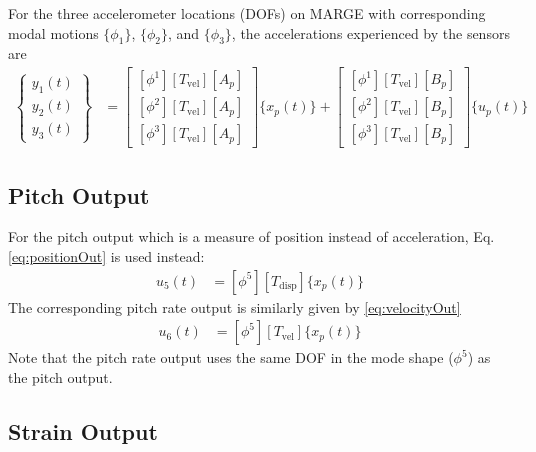 For the three accelerometer locations (DOFs) on MARGE with corresponding modal motions $\{\phi_1\}$, $\{\phi_2\}$, and $\{\phi_3\}$, the accelerations experienced by the sensors are
\begin{align}
	\begin{Bmatrix} 	y_1(t) \\ y_2(t) \\ y_3(t) \end{Bmatrix}
	&= \begin{bmatrix}
		\left[ \phi^1 \right] [T_\text{vel}] [A_p] \\
		\left[ \phi^2 \right] [T_\text{vel}] [A_p] \\
		\left[ \phi^3 \right] [T_\text{vel}] [A_p]
	\end{bmatrix} \{x_p(t)\}
	+ \begin{bmatrix}
		\left[ \phi^1 \right] [T_\text{vel}] [B_p] \\
		\left[ \phi^2 \right] [T_\text{vel}] [B_p] \\
		\left[ \phi^3 \right] [T_\text{vel}] [B_p]
	\end{bmatrix} \{u_p(t)\}
\end{align}

\subsection{Pitch Output} %

For the pitch output which is a measure of position instead of acceleration, Eq. \ref{eq:positionOut} is used instead:
\begin{align}
	u_5(t) &= \left[ \phi^5 \right] [T_\text{disp}] \{x_p(t)\}
\end{align}
The corresponding pitch rate output is similarly given by \ref{eq:velocityOut}
\begin{align}
	u_6(t) &= \left[ \phi^5 \right] [T_\text{vel}] \{x_p(t)\}
\end{align}
Note that the pitch rate output uses the same DOF in the mode shape ($\phi^5$) as the pitch output.

\subsection{Strain Output} %

